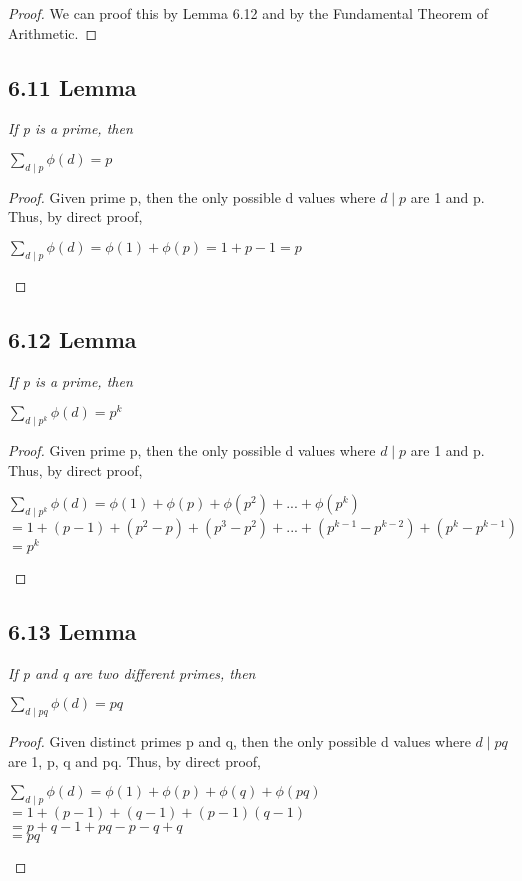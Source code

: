 \documentclass{article}
\begin{document}
\begin{proof}
We can proof this by Lemma 6.12 and by the Fundamental Theorem of Arithmetic.
\end{proof}

\subsection*{6.11 Lemma} 
\quad \textit{If p is a prime, then}
\begin{center}
    $\sum_{d \mid p} \phi(d) = p$
\end{center}

\begin{proof}
Given prime p, then the only possible d values where $d \mid p$ are 1 and p. Thus, by direct proof,
\begin{center}
    $\sum_{d \mid p} \phi(d) = \phi(1) + \phi(p) = 1 + p - 1 = p$
\end{center}
\end{proof}

\subsection*{6.12 Lemma} 
\quad \textit{If p is a prime, then}
\begin{center}
    $\sum_{d \mid p^k} \phi(d) = p^k$
\end{center}

\begin{proof}
Given prime p, then the only possible d values where $d \mid p$ are 1 and p. Thus, by direct proof,
\begin{center}
    $\sum_{d \mid p^k} \phi(d) = \phi(1) + \phi(p) + \phi(p^2) + ... + \phi(p^k)$\\
    $= 1 + (p - 1) + (p^2 - p) + (p^3 - p^2) + ... + (p^{k-1} - p^{k-2}) + (p^k - p^{k-1})$\\
    $ = p^k$
\end{center}
\end{proof}

\subsection*{6.13 Lemma} 
\quad \textit{If p and q are two different primes, then}
\begin{center}
    $\sum_{d \mid pq} \phi(d) = pq$
\end{center}

\begin{proof}
Given distinct primes p and q, then the only possible d values where $d \mid pq$ are 1, p, q and pq. Thus, by direct proof,
\begin{center}
    $\sum_{d \mid p} \phi(d) = \phi(1) + \phi(p) + \phi(q) + \phi(pq)$\\
    $= 1 + (p - 1) + (q - 1) + (p-1)(q-1)$\\
    $= p + q - 1 + pq - p - q + q$\\
    $= pq$
\end{center}
\end{proof}
\end{document}
